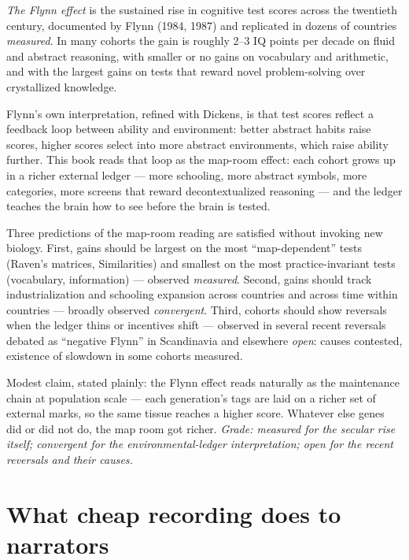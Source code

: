 \textit{The Flynn effect} is the sustained rise in cognitive test scores across the twentieth century, documented by Flynn (1984, 1987) and replicated in dozens of countries \textit{measured}. In many cohorts the gain is roughly 2--3 IQ points per decade on fluid and abstract reasoning, with smaller or no gains on vocabulary and arithmetic, and with the largest gains on tests that reward novel problem-solving over crystallized knowledge.

Flynn's own interpretation, refined with Dickens, is that test scores reflect a feedback loop between ability and environment: better abstract habits raise scores, higher scores select into more abstract environments, which raise ability further. This book reads that loop as the map-room effect: each cohort grows up in a richer external ledger --- more schooling, more abstract symbols, more categories, more screens that reward decontextualized reasoning --- and the ledger teaches the brain how to see before the brain is tested.

Three predictions of the map-room reading are satisfied without invoking new biology. First, gains should be largest on the most ``map-dependent'' tests (Raven's matrices, Similarities) and smallest on the most practice-invariant tests (vocabulary, information) --- observed \textit{measured}. Second, gains should track industrialization and schooling expansion across countries and across time within countries --- broadly observed \textit{convergent}. Third, cohorts should show reversals when the ledger thins or incentives shift --- observed in several recent reversals debated as ``negative Flynn'' in Scandinavia and elsewhere \textit{open}: causes contested, existence of slowdown in some cohorts measured.

Modest claim, stated plainly: the Flynn effect reads naturally as the maintenance chain at population scale --- each generation's tags are laid on a richer set of external marks, so the same tissue reaches a higher score. Whatever else genes did or did not do, the map room got richer. \textit{Grade: measured for the secular rise itself; convergent for the environmental-ledger interpretation; open for the recent reversals and their causes.}

\section{What cheap recording does to narrators}

